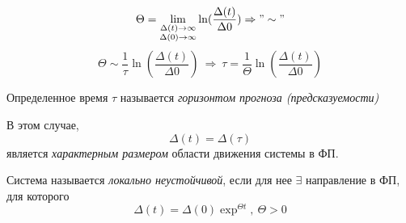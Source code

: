 \begin{equation}
  \Theta = \lim_{\substack{\Delta(t)\rightarrow\infty \\ \Delta(0)\rightarrow\infty}} \ln(\frac{\Delta(t)}{\Delta{0}}) \Rightarrow "\sim"
\end{equation}
\begin{equation}
  \Theta \sim \frac{1}{\tau}\ln(\frac{\Delta(t)}{\Delta{0}})\ \Rightarrow\ \tau = \frac{1}{\Theta}\ln(\frac{\Delta(t)}{\Delta{0}})
\end{equation}

Определенное время $\tau$ называется \textit{горизонтом прогноза (предсказуемости)}

В этом случае, $$\Delta(t) = \Delta(\tau)$$ является \textit{характерным размером} области движения системы в ФП.

\begin{remark}
	Система называется \textit{локально неустойчивой}, если для нее $\exists$ направление в ФП, для которого $$\Delta(t) = \Delta(0)\exp^{\Theta t}, \ \Theta>0$$
\end{remark}
